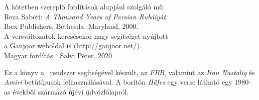 \thispagestyle{plain}
\begin{center}
  \small
  A kötetben szereplő fordítások alapjául szolgáló mű:\\
  \bigskip
  Reza Saberi: \emph{A Thousand Years of Persian Rubáiyát}.\\
  Ibex Publishers, Bethesda, Maryland, 2000.\\
  \bigskip
  A versváltozatok keresésekor nagy segítséget nyújtott\\
  a Ganjoor weboldal is (http://ganjoor.net/).\\
  \bigskip
  Magyar fordítás\ \textcopyright\ Salvi Péter, 2020
\end{center}
\vspace*{\fill}
{\footnotesize Ez a könyv a \XeLaTeX\ rendszer segítségével készült, az \emph{FBB},
  valamint az \emph{Iran Nastaliq} és \emph{Amiri} betűtípusok felhasználásával.
  A borítón \emph{Hâfez} egy verse látható egy 1980-as évekből származó
  újévi üdvözlőlapról.
}

